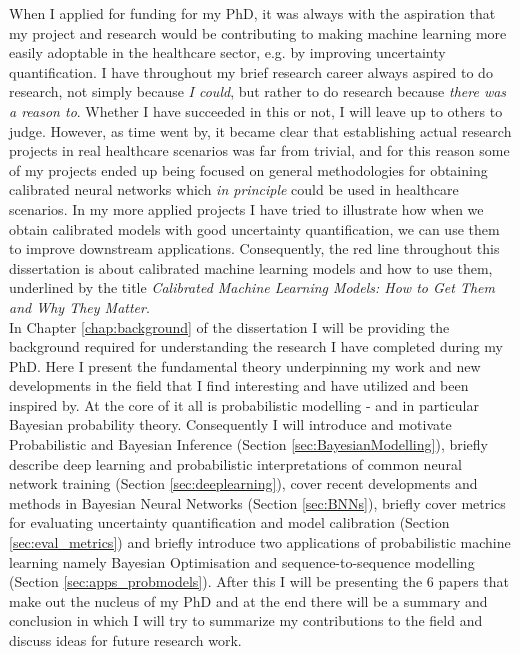 When I applied for funding for my PhD, it was always with the aspiration that my project and research would be contributing to making machine learning more easily adoptable in the healthcare sector, e.g. by improving uncertainty quantification. I have throughout my brief research career always aspired to do research, not simply because \textit{I could}, but rather to do research because \textit{there was a reason to}. Whether I have succeeded in this or not, I will leave up to others to judge. However, as time went by, it became clear that establishing actual research projects in real healthcare scenarios was far from trivial, and for this reason some of my projects ended up being focused on general methodologies for obtaining calibrated neural networks which \textit{in principle} could be used in healthcare scenarios. In my more applied projects I have tried to illustrate how when we obtain calibrated models with good uncertainty quantification, we can use them to improve downstream applications. Consequently, the red line throughout this dissertation is about calibrated machine learning models and how to use them, underlined by the title \textit{Calibrated Machine Learning Models: How to Get Them and Why They Matter}. \\

\noindent In Chapter \ref{chap:background} of the dissertation I will be providing the background required for understanding the research I have completed during my PhD. Here I present the fundamental theory underpinning my work and new developments in the field that I find interesting and have utilized and been inspired by. At the core of it all is probabilistic modelling - and in particular Bayesian probability theory. Consequently I will introduce and motivate Probabilistic and Bayesian Inference (Section \ref{sec:BayesianModelling}), briefly describe deep learning and probabilistic interpretations of common neural network training (Section \ref{sec:deeplearning}), cover recent developments and methods in Bayesian Neural Networks (Section \ref{sec:BNNs}), briefly cover metrics for evaluating uncertainty quantification and model calibration (Section \ref{sec:eval_metrics}) and briefly introduce two applications of probabilistic machine learning namely Bayesian Optimisation and sequence-to-sequence modelling (Section \ref{sec:apps_probmodels}). After this I will be presenting the 6 papers that make out the nucleus of my PhD and at the end there will be a summary and conclusion in which I will try to summarize my contributions to the field and discuss ideas for future research work.\\

